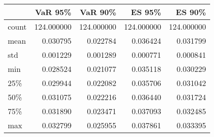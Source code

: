 \begin{tabular}{lrrrr}
\toprule
{} &     VaR 95\% &     VaR 90\% &      ES 95\% &      ES 90\% \\
\midrule
count &  124.000000 &  124.000000 &  124.000000 &  124.000000 \\
mean  &    0.030795 &    0.022784 &    0.036424 &    0.031799 \\
std   &    0.001229 &    0.001289 &    0.000771 &    0.000841 \\
min   &    0.028524 &    0.021077 &    0.035118 &    0.030229 \\
25\%   &    0.029944 &    0.022082 &    0.035706 &    0.031042 \\
50\%   &    0.031075 &    0.022216 &    0.036440 &    0.031724 \\
75\%   &    0.031890 &    0.023471 &    0.037093 &    0.032485 \\
max   &    0.032799 &    0.025955 &    0.037861 &    0.033395 \\
\bottomrule
\end{tabular}
